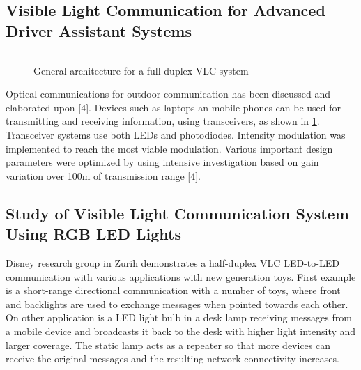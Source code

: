 \subsection{Visible Light Communication for Advanced Driver Assistant Systems}

\begin{figure}[htbp]
  \centering
    \rule{35em}{0.5pt}
  \caption[General architecture for a full duplex VLC system ]{General architecture for a full duplex VLC system }
  \label{fig:vlc-driver}
\end{figure}

Optical communications for outdoor communication has been discussed and elaborated
upon [4]. Devices such as laptops an mobile phones can be used for transmitting and
receiving information, using transceivers, as shown in \ref{fig:vlc-driver}. Transceiver systems use
both LEDs and photodiodes. Intensity modulation was implemented to reach the most
viable modulation. Various important design parameters were optimized by using
intensive investigation based on gain variation over 100m of transmission range [4]. 

\subsection{Study of Visible Light Communication System Using RGB LED Lights}

Disney research group in Zurih {\citep{disney}} demonstrates a half-duplex VLC LED-to-LED communication with various applications with new generation toys.
First example is a short-range directional communication with
a number of toys, where front and backlights are used to exchange
messages when pointed towards each other. On other application is a LED light bulb in a desk lamp receiving
messages from a mobile device and broadcasts it back to the desk
with higher light intensity and larger coverage. The static lamp acts
as a repeater so that more devices can receive the original messages
and the resulting network connectivity increases.



